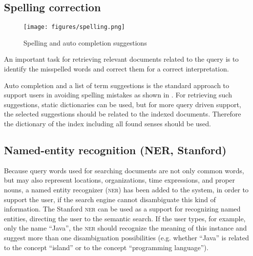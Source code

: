 \documentclass[output=paper]{LSP/langsci}
\begin{document}
\subsection{Spelling correction} %
\begin{figure}
	\centering
	\texttt{[image: figures/spelling.png]}
	\caption{Spelling and auto completion suggestions}
  \label{fig:spelling}
\end{figure}

An important task for retrieving relevant documents related to the query is to identify the misspelled words and correct them for a correct interpretation. 

Auto completion and a list of term suggestions is the standard approach to support users in avoiding spelling mistakes as shown in . For retrieving such suggestions, static dictionaries can be used, but for more query driven support, the selected suggestions should be related to the indexed documents. Therefore the dictionary of the index including all found senses should be used.

\subsection{Named-entity recognition (NER, Stanford)} 
Because query words used for searching documents are not only common words, but may also represent locations, organizations, time expressions, and proper nouns, a named entity recognizer (\textsc{ner}) has been added to the system, in order to support the user, if the search engine cannot disambiguate this kind of information. The Stanford \textsc{ner} \citet{FinGreMan05} can be used as a support for recognizing named entities, directing the user to the semantic search. If the user types, for example, only the name ``Java'', the \textsc{ner} should recognize the meaning of this instance and suggest more than one disambiguation possibilities (e.g. whether ``Java'' is related to the concept ``island'' or to the concept ``programming language'').
\end{document}
